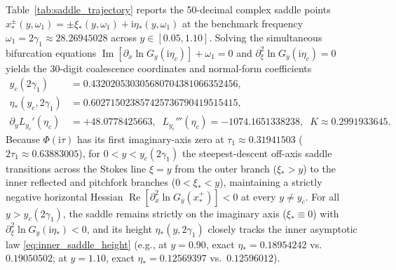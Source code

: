 \documentclass[11pt,a4paper,reqno]{amsart}
\theoremstyle{definition}
\theoremstyle{remark}
\numberwithin{equation}{section}
\newcommand{\ii}{\mathrm{i}}
\newcommand{\Rea}{\operatorname{Re}}
\newcommand{\Ima}{\operatorname{Im}}
\begin{document}
Table~\ref{tab:saddle_trajectory} reports the 50-decimal complex saddle points $x_*^\pm(y,\omega_1) = \pm\xi_*(y,\omega_1) + \ii\eta_*(y,\omega_1)$ at the benchmark frequency $\omega_1 = 2\gamma_1 \approx 28.26945028$ across $y \in [0.05, 1.10]$. Solving the simultaneous bifurcation equations $\Ima[\partial_x\ln G_y(\ii\eta_c)] + \omega_1 = 0$ and $\partial_\xi^2\ln G_y(\ii\eta_c) = 0$ yields the 30-digit coalescence coordinates and normal-form coefficients
\begin{equation}\label{eq:exact_yc_digits}
\begin{aligned}
y_c(2\gamma_1) &= 0.432020530305680704381066352456, \\
\eta_*(y_c, 2\gamma_1) &= 0.602715023857425736790419515415, \\
\partial_y L_{y_c}'(\eta_c) &= +48.0778425663, \;\; L_{y_c}'''(\eta_c) = -1074.1651338238, \;\; K \approx 0.2991933645.
\end{aligned}
\end{equation}
Because $\Phi(\ii\tau)$ has its first imaginary-axis zero at $\tau_1 \approx 0.31941503$ ($2\tau_1 \approx 0.63883005$), for $0 < y < y_c(2\gamma_1)$ the steepest-descent off-axis saddle transitions across the Stokes line $\xi = y$ from the outer branch ($\xi_* > y$) to the inner reflected and pitchfork branches ($0 < \xi_* < y$), maintaining a strictly negative horizontal Hessian $\Rea[\partial_x^2\ln G_y(x_*^+)] < 0$ at every $y \neq y_c$. For all $y > y_c(2\gamma_1)$, the saddle remains strictly on the imaginary axis ($\xi_* \equiv 0$) with $\partial_\xi^2\ln G_y(\ii\eta_*) < 0$, and its height $\eta_*(y,2\gamma_1)$ closely tracks the inner asymptotic law \eqref{eq:inner_saddle_height} (e.g., at $y=0.90$, exact $\eta_* = 0.18954242$ vs.\ $0.19050502$; at $y=1.10$, exact $\eta_* = 0.12569397$ vs.\ $0.12596012$).
\end{document}
